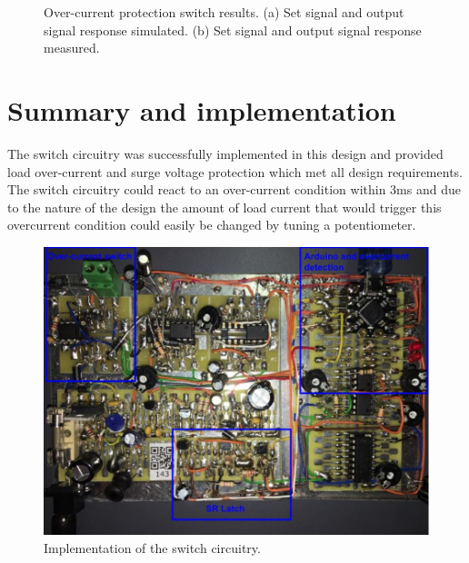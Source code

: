 \begin{figure}[!ht]
\begin{subfigure}[]{0.4\textwidth}
		   \caption{ } \label{subfig:switch_meas_trip}
     \end{subfigure}
     \caption[Over-current protection switch results.]{Over-current protection switch results. (a) Set signal and output signal response simulated. (b) Set signal and output signal response measured.} \label{fig:switch_results}
\end{figure}

\section{Summary and implementation}
The switch circuitry was successfully implemented in this design and provided load over-current and surge voltage protection which met all design requirements. The switch circuitry could react to an over-current condition within 3ms and due to the nature of the design the amount of load current that would trigger this overcurrent condition could easily be changed by tuning a potentiometer.

\begin{figure}[h]
    \centering
  		\includegraphics[width=0.45\linewidth]{./Figures/switch_pcb.jpg}
		   \caption{Implementation of the switch circuitry. } \label{subfig:switch_pcb}
     \end{figure}




